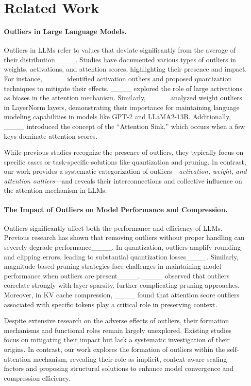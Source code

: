 \section{Related Work}
\label{sec:related}
\vspace{-0.5mm}
\paragraph{Outliers in Large Language Models.}\label{subsec:related-outlier}
Outliers in LLMs refer to values that deviate significantly from the average of their distribution____. Studies have documented various types of outliers in weights, activations, and attention scores, highlighting their presence and impact. For instance, ____ identified activation outliers and proposed quantization techniques to mitigate their effects. ____ explored the role of large activations as biases in the attention mechanism. Similarly, ____ analyzed weight outliers in LayerNorm layers, demonstrating their importance for maintaining language modeling capabilities in models like GPT-2 and LLaMA2-13B. Additionally, ____ introduced the concept of the “Attention Sink,” which occurs when a few keys dominate attention scores.

While previous studies recognize the presence of outliers, they typically focus on specific cases or task-specific solutions like quantization and pruning. In contrast, our work provides a systematic categorization of outliers—\emph{activation, weight, and attention outliers}—and reveals their interconnections and collective influence on the attention mechanism in LLMs.

\vspace{-0.5mm}
\paragraph{The Impact of Outliers on Model Performance and Compression.}\label{subsec:related-influence}
Outliers significantly affect both the performance and efficiency of LLMs. Previous research has shown that removing outliers without proper handling can severely degrade performance____. In quantization, outliers amplify rounding and clipping errors, leading to substantial quantization losses____. Similarly, magnitude-based pruning strategies face challenges in maintaining model performance when outliers are present____. ____ observed that outliers correlate strongly with layer sparsity, further complicating pruning approaches. Moreover, in KV cache compression, ____ found that attention score outliers associated with specific tokens play a critical role in preserving context.

Despite extensive research on the adverse effects of outliers, their formation mechanisms and functional roles remain largely unexplored. Existing studies focus on mitigating their impact but lack a systematic investigation of their origins. In contrast, our work explores the formation of outliers within the self-attention mechanism, revealing their role as implicit, context-aware scaling factors and proposing structural solutions to enhance model convergence and compression efficiency.

\vspace{-0.5mm}